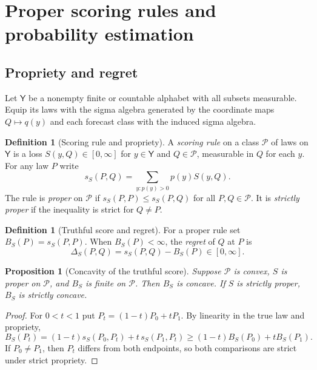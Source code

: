 \documentclass[11pt,oneside]{book}
\newtheorem{proposition}[theorem]{Proposition}
\theoremstyle{definition}
\newtheorem{definition}[theorem]{Definition}
\theoremstyle{remark}
\begin{document}
\clearpage
\section{Proper scoring rules and probability estimation}
\label{sec:proper-scoring-rules}

\subsection{Propriety and regret}
\label{subsec:score-propriety}

Let $\mathsf Y$ be a nonempty finite or countable alphabet with all
subsets measurable. Equip its laws with the sigma algebra generated
by the coordinate maps $Q\mapsto q(y)$ and each forecast class with
the induced sigma algebra.

\begin{definition}[Scoring rule and propriety]
\label{def:proper-scoring-rule}
A \emph{scoring rule} on a class $\mathcal P$ of laws on $\mathsf Y$
is a loss $S(y,Q)\in[0,\infty]$ for $y\in\mathsf Y$ and
$Q\in\mathcal P$, measurable in $Q$ for each $y$. For any law $P$ write
\[
s_S(P,Q)=\sum_{y:p(y)>0}p(y)S(y,Q).
\]
The rule is \emph{proper} on $\mathcal P$ if
$s_S(P,P)\leq s_S(P,Q)$ for all $P,Q\in\mathcal P$. It is
\emph{strictly proper} if the inequality is strict for $Q\ne P$.
\end{definition}

\begin{definition}[Truthful score and regret]
\label{def:scoring-regret}
For a proper rule set $B_S(P)=s_S(P,P)$. When $B_S(P)<\infty$,
the \emph{regret} of $Q$ at $P$ is
\[
\Delta_S(P,Q)=s_S(P,Q)-B_S(P)\in[0,\infty].
\]
\end{definition}

\begin{proposition}[Concavity of the truthful score]
\label{prop:proper-score-concavity}
Suppose $\mathcal P$ is convex, $S$ is proper on $\mathcal P$,
and $B_S$ is finite on $\mathcal P$. Then $B_S$ is concave.
If $S$ is strictly proper, $B_S$ is strictly concave.
\end{proposition}
\begin{proof}
For $0<t<1$ put $P_t=(1-t)P_0+tP_1$. By linearity in the true law
and propriety,
\[
B_S(P_t)
=(1-t)s_S(P_0,P_t)+t\,s_S(P_1,P_t)
\geq (1-t)B_S(P_0)+t B_S(P_1).
\]
If $P_0\ne P_1$, then $P_t$ differs from both endpoints, so both
comparisons are strict under strict propriety.
\end{proof}
\end{document}
